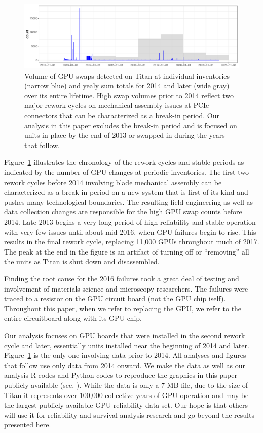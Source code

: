 \begin{figure}[tb]
  \centering
  \includegraphics[width=\textwidth]{figs/chronology001.pdf}
  \caption{Volume of GPU swaps detected on Titan at individual
    inventories (narrow blue) and yealy sum totals for 2014 and later
    (wide gray) over its entire lifetime. High swap volumes prior to
    2014 reflect two major rework cycles on mechanical assembly issues
    at PCIe connectors that can be characterized as a break-in
    period. Our analysis in this paper excludes the break-in period
    and is focused on units in place by the end of 2013 or swapped in
    during the years that follow.}
  \label{fig:chronology}
\end{figure}
Figure~\ref{fig:chronology} illustrates the chronology of the rework
cycles and stable periods as indicated by the number of GPU changes at
periodic inventories. The first two rework cycles before 2014
involving blade mechanical assembly can be characterized as a break-in
period on a new system that is first of its kind and pushes many
technological boundaries. The resulting field engineering as well as
data collection changes are responsible for the high GPU swap counts
before 2014. Late 2013 begins a very long period of high reliability
and stable operation with very few issues until about mid 2016, when
GPU failures begin to rise. This results in the final rework cycle,
replacing 11,000 GPUs throughout much of 2017. The peak at the end in
the figure is an artifact of turning off or ``removing'' all the
units as Titan is shut down and disassembled.

Finding the root cause for the 2016 failures took a great deal of
testing and involvement of materials science and microscopy
researchers. The failures were traced to a resistor on the GPU
circuit board (not the GPU chip iself). Throughout this paper, when we
refer to replacing the GPU, we refer to the entire circuitboard along
with its GPU chip.

Our analysis focuses on GPU boards that were installed in the second
rework cycle and later, essentially units installed near the beginning
of 2014 and later. Figure~\ref{fig:chronology} is the only one
involving data prior to 2014. All analyses and figures that follow use
only data from 2014 onward. We make the data as well as our analysis R
codes and Python codes to reproduce the graphics in this paper
publicly available (see, \cite[repository to be added in final
version]{repositoryreference,rcodes,pycodes}).  While the data is only
a 7 MB file, due to the size of Titan it represents over 100,000
collective years of GPU operation and may be the largest publicly
available GPU reliability data set. Our hope is that others will use
it for reliability and survival analysis research and go beyond the
results presented here.

